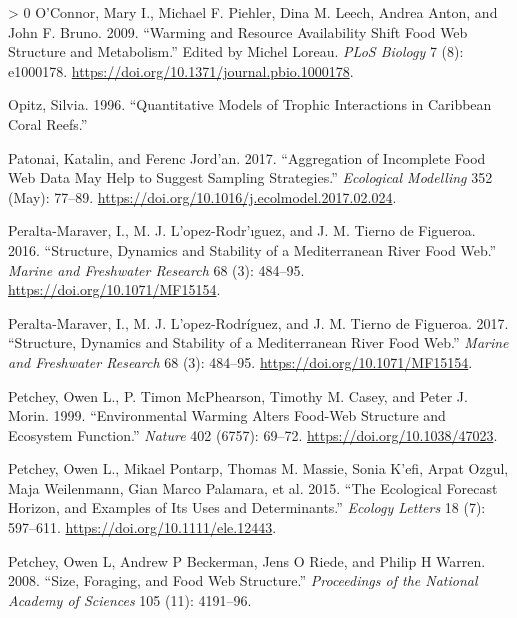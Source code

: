 \documentclass{article}
\newlength{\cslhangindent}
\newenvironment{CSLReferences}[3] %
 {%
  \setlength{\parindent}{0pt}
  \ifodd #1 \everypar{\setlength{\hangindent}{\cslhangindent}}\ignorespaces\fi
  \ifnum #2 > 0
  \setlength{\parskip}{#2\baselineskip}
  \fi
 }%
 {}
\begin{document}
\begin{CSLReferences}{1}{0}
\leavevmode\hypertarget{ref-oconnorWarmingResourceAvailability2009}{}%
O'Connor, Mary I., Michael F. Piehler, Dina M. Leech, Andrea Anton, and
John F. Bruno. 2009. {``Warming and {Resource Availability Shift Food
Web Structure} and {Metabolism}.''} Edited by Michel Loreau. \emph{PLoS
Biology} 7 (8): e1000178.
\url{https://doi.org/10.1371/journal.pbio.1000178}.

\leavevmode\hypertarget{ref-opitz1996}{}%
Opitz, Silvia. 1996. {``Quantitative Models of Trophic Interactions in
Caribbean Coral Reefs.''}

\leavevmode\hypertarget{ref-patonaiAggregationIncompleteFood2017}{}%
Patonai, Katalin, and Ferenc Jord'an. 2017. {``Aggregation of Incomplete
Food Web Data May Help to Suggest Sampling Strategies.''}
\emph{Ecological Modelling} 352 (May): 77--89.
\url{https://doi.org/10.1016/j.ecolmodel.2017.02.024}.

\leavevmode\hypertarget{ref-peralta-maraverStructureDynamicsStability2016a}{}%
Peralta-Maraver, I., M. J. L'opez-Rodr'ıguez, and J. M. Tierno de
Figueroa. 2016. {``Structure, Dynamics and Stability of a
{Mediterranean} River Food Web.''} \emph{Marine and Freshwater Research}
68 (3): 484--95. \url{https://doi.org/10.1071/MF15154}.

\leavevmode\hypertarget{ref-peralta-maraverStructureDynamicsStability2017}{}%
Peralta-Maraver, I., M. J. L'opez-Rodríguez, and J. M. Tierno de
Figueroa. 2017. {``Structure, Dynamics and Stability of a
{Mediterranean} River Food Web.''} \emph{Marine and Freshwater Research}
68 (3): 484--95. \url{https://doi.org/10.1071/MF15154}.

\leavevmode\hypertarget{ref-petcheyEnvironmentalWarmingAlters1999}{}%
Petchey, Owen L., P. Timon McPhearson, Timothy M. Casey, and Peter J.
Morin. 1999. {``Environmental Warming Alters Food-Web Structure and
Ecosystem Function.''} \emph{Nature} 402 (6757): 69--72.
\url{https://doi.org/10.1038/47023}.

\leavevmode\hypertarget{ref-petcheyEcologicalForecastHorizon2015}{}%
Petchey, Owen L., Mikael Pontarp, Thomas M. Massie, Sonia K'efi, Arpat
Ozgul, Maja Weilenmann, Gian Marco Palamara, et al. 2015. {``The
Ecological Forecast Horizon, and Examples of Its Uses and
Determinants.''} \emph{Ecology Letters} 18 (7): 597--611.
\url{https://doi.org/10.1111/ele.12443}.

\leavevmode\hypertarget{ref-petchey2008size}{}%
Petchey, Owen L, Andrew P Beckerman, Jens O Riede, and Philip H Warren.
2008. {``Size, Foraging, and Food Web Structure.''} \emph{Proceedings of
the National Academy of Sciences} 105 (11): 4191--96.


\end{CSLReferences}
\end{document}
